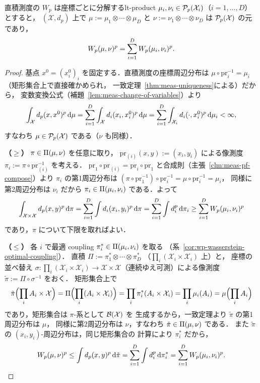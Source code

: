 \begin{theorem}{直積測度の $W_p$ は座標ごとに分解する}{lt-product}
  $\mu_i,\nu_i\in\mathcal{P}_{p}(\mathcal{X}_i)$（$i=1,\dots,D$）とすると，
  $(\mathcal{X},d_p)$ 上で
  $\mu:=\mu_1\otimes\cdots\otimes\mu_D$ と
  $\nu:=\nu_1\otimes\cdots\otimes\nu_D$ は
  $\mathcal{P}_{p}(\mathcal{X})$ の元であり，
  \[
    W_p(\mu,\nu)^p=\sum_{i=1}^DW_p(\mu_i,\nu_i)^p.
  \]
\end{theorem}

\begin{proof}
  基点 $x^0=(x^0_i)_i$ を固定する．直積測度の座標周辺分布は
  $\mu\circ\mathrm{pr}_i^{-1}=\mu_i$（矩形集合上で直接確かめられ，
  一致定理~\ref{thm:meas-uniqueness}による）だから，
  変数変換公式（補題~\ref{lem:meas-change-of-variables}）より
  \[
    \int_{\mathcal{X}}d_p(x,x^0)^p\,\mathrm{d}\mu
    =\sum_{i=1}^D\int_{\mathcal{X}}d_i(x_i,x^0_i)^p\,\mathrm{d}\mu
    =\sum_{i=1}^D\int_{\mathcal{X}_i}d_i(\cdot,x^0_i)^p\,\mathrm{d}\mu_i<\infty,
  \]
  すなわち $\mu\in\mathcal{P}_{p}(\mathcal{X})$ である（$\nu$ も同様）．

  \textbf{（$\geq$）}
  $\pi\in\Pi(\mu,\nu)$ を任意に取り，
  $\mathrm{pr}_{(i)}(x,y):=(x_i,y_i)$ による像測度
  $\pi_i:=\pi\circ\mathrm{pr}_{(i)}^{-1}$ を考える．
  $\mathrm{pr}_1\circ\mathrm{pr}_{(i)}=\mathrm{pr}_i\circ\mathrm{pr}_1$
  と合成則（主張~\ref{clm:meas-pf-compose}）より
  $\pi_i$ の第1周辺分布は
  $(\pi\circ\mathrm{pr}_1^{-1})\circ\mathrm{pr}_i^{-1}
  =\mu\circ\mathrm{pr}_i^{-1}=\mu_i$，
  同様に第2周辺分布は $\nu_i$ だから
  $\pi_i\in\Pi(\mu_i,\nu_i)$ である．よって
  \[
    \int_{\mathcal{X}\times\mathcal{X}}d_p(x,y)^p\,\mathrm{d}\pi
    =\sum_{i=1}^D\int d_i(x_i,y_i)^p\,\mathrm{d}\pi
    =\sum_{i=1}^D\int d_i^p\,\mathrm{d}\pi_i
    \geq\sum_{i=1}^DW_p(\mu_i,\nu_i)^p
  \]
  であり，$\pi$ について下限を取ればよい．

  \textbf{（$\leq$）}
  各 $i$ で最適 coupling
  $\pi_i^*\in\Pi(\mu_i,\nu_i)$ を取る
  （系~\ref{cor:wp-wasserstein-optimal-coupling}）．
  直積 $\Pi:=\pi_1^*\otimes\cdots\otimes\pi_D^*$
  （$\prod_i(\mathcal{X}_i\times\mathcal{X}_i)$ 上）と，
  座標の並べ替え
  $\sigma\colon\prod_i(\mathcal{X}_i\times\mathcal{X}_i)
  \to\mathcal{X}\times\mathcal{X}$（連続ゆえ可測）による像測度
  $\tilde\pi:=\Pi\circ\sigma^{-1}$ をおく．
  矩形集合上で
  \[
    \tilde\pi\Bigl(\prod_iA_i\times\mathcal{X}\Bigr)
    =\Pi\Bigl(\prod_i(A_i\times\mathcal{X}_i)\Bigr)
    =\prod_i\pi_i^*(A_i\times\mathcal{X}_i)
    =\prod_i\mu_i(A_i)
    =\mu\Bigl(\prod_iA_i\Bigr)
  \]
  であり，矩形集合は $\pi$-系として $\mathcal{B}(\mathcal{X})$ を
  生成するから，一致定理より $\tilde\pi$ の第1周辺分布は $\mu$，
  同様に第2周辺分布は $\nu$，すなわち
  $\tilde\pi\in\Pi(\mu,\nu)$ である．
  また $\tilde\pi$ の $(x_i,y_i)$-周辺分布は，同じ矩形集合の
  計算により $\pi_i^*$ だから，
  \[
    W_p(\mu,\nu)^p
    \leq\int d_p(x,y)^p\,\mathrm{d}\tilde\pi
    =\sum_{i=1}^D\int d_i^p\,\mathrm{d}\pi_i^*
    =\sum_{i=1}^DW_p(\mu_i,\nu_i)^p.  \qedhere
  \]
\end{proof}

